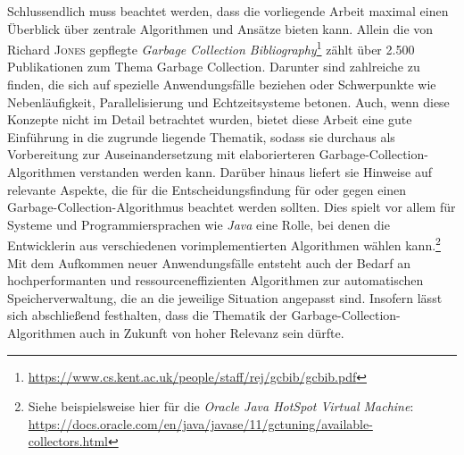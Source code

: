 Schlussendlich muss beachtet werden, dass die vorliegende Arbeit maximal einen Überblick über zentrale Algorithmen und Ansätze bieten kann.
Allein die von Richard \textsc{Jones} gepflegte \textit{Garbage Collection Bibliography}\footnote{\url{https://www.cs.kent.ac.uk/people/staff/rej/gcbib/gcbib.pdf}} zählt über 2.500 Publikationen zum Thema Garbage Collection.
Darunter sind zahlreiche zu finden, die sich auf spezielle Anwendungsfälle beziehen oder Schwerpunkte wie Nebenläufigkeit, Parallelisierung und Echtzeitsysteme betonen.
Auch, wenn diese Konzepte nicht im Detail betrachtet wurden, bietet diese Arbeit eine gute Einführung in die zugrunde liegende Thematik, sodass sie durchaus als Vorbereitung zur Auseinandersetzung mit elaborierteren Garbage-Collection-Algorithmen verstanden werden kann.
Darüber hinaus liefert sie Hinweise auf relevante Aspekte, die für die Entscheidungsfindung für oder gegen einen Garbage-Collection-Algorithmus beachtet werden sollten.
Dies spielt vor allem für Systeme und Programmiersprachen wie \textit{Java} eine Rolle, bei denen die Entwicklerin aus verschiedenen vorimplementierten Algorithmen wählen kann.\footnote{Siehe beispielsweise hier für die \textit{Oracle Java HotSpot Virtual Machine}: \url{https://docs.oracle.com/en/java/javase/11/gctuning/available-collectors.html}}
Mit dem Aufkommen neuer Anwendungsfälle entsteht auch der Bedarf an hochperformanten und ressourceneffizienten Algorithmen zur automatischen Speicherverwaltung, die an die jeweilige Situation angepasst sind.
Insofern lässt sich abschließend festhalten, dass die Thematik der Garbage-Collection-Algorithmen auch in Zukunft von hoher Relevanz sein dürfte.